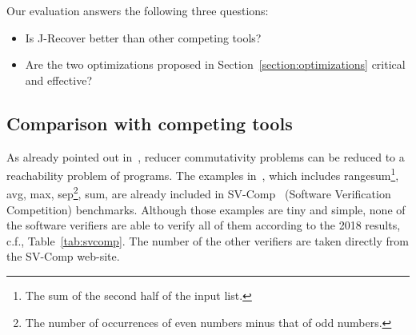 \documentclass{llncs}
\newcommand{\hide}[1]{}
\begin{document}
\hide{For the third set of benchmarks, we created a program that randomly generate reducer program in order to test the scalability of J-Recover, which we can give as parameter the number of variables $N$, branch statements $B$, assignment statements $A$. All assignments are in them form of $v_1 := v_2\circ v_3$ and all guards are in the form of $v_1 \circ v_2$. The source code of the random generator is available at \url{http://www.github.com/xxxxx}.}

Our evaluation answers the following three questions:
\begin{itemize}
	\item Is J-Recover better than other competing tools?
	\item Are the two optimizations proposed in Section~\ref{section:optimizations} critical and effective?
\end{itemize} 

\subsection{Comparison with competing tools}
As already pointed out in~\cite{ChenHSW15}, reducer commutativity problems can be reduced to a reachability problem of programs. 
The examples in~\cite{ChenHSW15}, which includes \textsf{rangesum}\footnote{The sum of the second half of the input list.}, \textsf{avg}, \textsf{max}, \textsf{sep}\footnote{The number of occurrences of even numbers minus that of odd numbers.}, \textsf{sum}, are already included in SV-Comp~\cite{svcomp} (Software Verification Competition) benchmarks.
Although those examples are tiny and simple, none of the software verifiers are able to verify all of them according to the 2018 results, c.f., Table~\ref{tab:svcomp}. The number of the other verifiers are taken directly from the SV-Comp web-site. 
\end{document}
